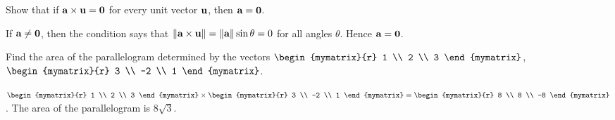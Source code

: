 \begin{ex}
  Show that if $\vect{a}\times \vect{u}=\vect{0}$ for every unit
  vector $\vect{u}$, then $\vect{a}=\vect{0}$.
  \begin{sol}
    If $\vect{a}\neq \vect{0}$, then the condition says that
    $\norm{\vect{a}\times \vect{u}} = \norm{\vect{a}} \sin \theta =0$
    for all angles $\theta$. Hence $\vect{a} = \vect{0}$.
  \end{sol}
\end{ex}

\begin{ex}
  Find the area of the parallelogram determined by the vectors
  $\begin{mymatrix}{r}
    1 \\
    2 \\
    3
  \end{mymatrix}$, $\begin{mymatrix}{r}
    3 \\
    -2 \\
    1
  \end{mymatrix}$.
  \begin{sol}
    $\begin{mymatrix}{r}
      1 \\
      2 \\
      3
    \end{mymatrix} \times
    \begin{mymatrix}{r}
      3 \\
      -2 \\
      1
    \end{mymatrix} =\begin{mymatrix}{r}
      8 \\
      8 \\
      -8
    \end{mymatrix}$. The area of the parallelogram is $8\sqrt{3}$.
  \end{sol}
\end{ex}

